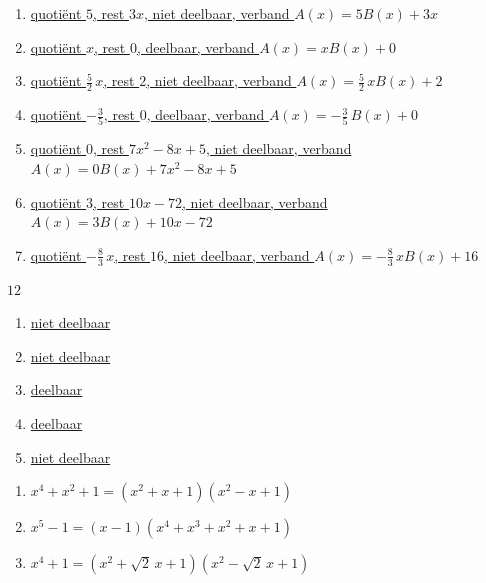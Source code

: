 \documentclass{ximera}
\begin{document}
\begin{Antwoord} \label{antw2.5}
\begin{enumerate}
\item
\hyperlink{oef2.5}{quotiënt $5$, rest $3x$, niet deelbaar, verband $A(x) = 5B(x)+3x$}
\item
\hyperlink{oef2.5}{quotiënt $x$, rest $0$, deelbaar, verband $A(x) = xB(x)+0$}
\item
\hyperlink{oef2.5}{quotiënt $\frac{5}{2}\,x$, rest $2$, niet deelbaar, verband $A(x) = \frac{5}{2}\,xB(x)+2$}
\item
\hyperlink{oef2.5}{quotiënt $-\frac{3}{5}$, rest $0$, deelbaar, verband $A(x) = -\frac{3}{5}\,B(x)+0$}
\item
\hyperlink{oef2.5}{quotiënt $0$, rest $7x^2-8x+5$, niet deelbaar, verband $A(x) = 0B(x)+7x^2-8x+5$}
\item
\hyperlink{oef2.5}{quotiënt $3$, rest $10x-72$, niet deelbaar, verband $A(x) = 3B(x)+10x-72$}
\item
\hyperlink{oef2.5}{quotiënt $-\frac{8}{3}\,x$, rest $16$, niet deelbaar, verband $A(x) = -\frac{8}{3}\,xB(x)+16$}
\end{enumerate}
\end{Antwoord}

\begin{Antwoord} \label{antw2.6}
\hyperlink{oef2.6}{$12$}
\end{Antwoord}

\begin{Antwoord} \label{antw2.7}
\begin{enumerate}
\item
\hyperlink{oef2.7}{niet deelbaar}
\item
\hyperlink{oef2.7}{niet deelbaar}
\item
\hyperlink{oef2.7}{deelbaar}
\item
\hyperlink{oef2.7}{deelbaar}
\item
\hyperlink{oef2.7}{niet deelbaar}
\end{enumerate}
\end{Antwoord}

\begin{Antwoord} \label{antw2.8}
\begin{enumerate}
\item
\hyperlink{oef2.8}{$x^4 + x^2 + 1 = (x^2+x+1)(x^2-x+1)$}
\item
\hyperlink{oef2.8}{$x^5 - 1 = (x-1)(x^4+x^3+x^2+x+1)$}
\item
\hyperlink{oef2.8}{$x^4 + 1 = (x^2+\sqrt{2}\,x+1)(x^2-\sqrt{2}\,x+1)$}
\end{enumerate}
\end{Antwoord}
\end{document}
